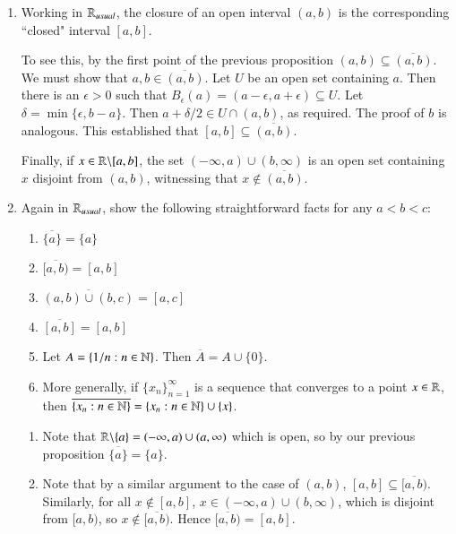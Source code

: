 \documentclass[12pt, a4paper, twoside, openright, titlepage]{book}
\begin{document}
\begin{eg}{}{}
    \leavevmode
    \begin{enumerate}
        \item Working in $\mathbb R_{usual}$, the closure of an open interval $(a,b)$ is the corresponding ``closed" interval $[a,b]$.

            To see this, by the first point of the previous proposition $(a,b) \subseteq \overline{(a,b)}$. We must show that $a,b \in \overline{(a,b)}$. Let $U$ be an open set containing $a$. Then there is an $\epsilon > 0$ such that $B_{\epsilon}(a) = (a-\epsilon,a+\epsilon) \subseteq U$. Let $\delta = \min\{\epsilon,b-a\}$. Then $a+\delta/2 \in U\cap (a,b)$, as required. The proof of $b$ is analogous. This established that $[a,b] \subseteq \overline{(a,b)}$.

            Finally, if $x \in \mathbb R\backslash[a,b]$, the set $(-\infty,a)\cup(b,\infty)$ is an open set containing $x$ disjoint from $(a,b)$, witnessing that $x \notin \overline{(a,b)}$.
        \item Again in $\mathbb R_{usual}$, show the following straightforward facts for any $a<b<c$:\begin{enumerate}
                \item $\overline{\{a\}} = \{a\}$
                \item $\overline{[a,b)} = [a,b]$
                \item $\overline{(a,b)\cup(b,c)} = [a,c]$
                \item $\overline{[a,b]} = [a,b]$
                \item Let $A = \{1/n:n \in \mathbb N\}$. Then $\overline{A} = A\cup\{0\}$.
                \item More generally, if $\{x_n\}_{n=1}^{\infty}$ is a sequence that converges to a point $x \in \mathbb R$, then $\overline{\{x_n:n \in \mathbb N\}} = \{x_n:n\in\mathbb N\}\cup\{x\}$.
        \end{enumerate}
            \begin{proof*}{}{}
                \leavevmode
                \begin{enumerate}
                    \item Note that $\mathbb R\backslash \{a\} = (-\infty,a)\cup(a,\infty)$ which is open, so by our previous proposition $\overline{\{a\}} = \{a\}$.
                    \item Note that by a similar argument to the case of $(a,b)$, $[a,b] \subseteq \overline{[a,b)}$. Similarly, for all $x \notin [a,b]$, $x \in (-\infty,a)\cup(b,\infty)$, which is disjoint from $[a,b)$, so $x \notin \overline{[a,b)}$. Hence $\overline{[a,b)} = [a,b]$.

\end{enumerate}
\end{proof*}
\end{enumerate}
\end{eg}
\end{document}
